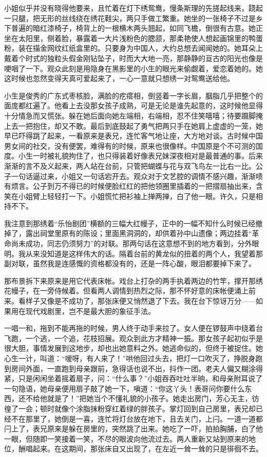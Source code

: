 \par 小姐似乎并没有晓得他要来，且忙着在灯下绣鸳鸯，慢条斯理的先搓起线来，跷起一只腿，把无形的丝线绕在绣花鞋尖，两只手做工繁重。她坐的一张椅子不过是乡下普遍的暗红漆椅子，椅背上的一根横木两头翘起，如同飞檐，倒很有古意。她正坐在太阳里，侧着脸，暴露着一大片浅粉色的腮颔，那柔艳使人想起画锦里的鸭蛋粉，装在描金网纹红纸盒里的。只要身为中国人，大约总想去闻闻她的。她耳朵上戴着个时式的独粒头假金刚钻坠子，时而大大地一亮，那静静的亘古的阳光也像是哽咽了一下。观众此刻是用隐身在黑影里的小生的眼光来偷觑着，爱恋着她的。她这时候也忽然变得天真可爱起来了，一心一意就只想绣一对鸳鸯送给他。
\par 小生是俊秀的广东式枣核脸，满脸的疙瘩相，倒竖着一字长眉，胭脂几乎把整个的面庞都红遍了。他看上去没那女孩子成熟，可是无论是谁先起意的，这时候他显得十分情急而又慌张。躲在她后面向她左端相，右端相，忍不住笑嘻嘻；待要蹑脚掩上去一把抱住，却又不敢。最后到底鼓起了勇气把两只手在她肩上虚虚的一笼，她早已吓得跳了起来，一看原来是表兄，连忙客气地让座，大方地对谈。古时候中国男女间的社交，没有便罢，难得有的时候，原来也很像样。中国原是个不可测的国度。小生一时被礼貌拘住了，也只得装着好像表兄妹深夜相对是最普通的事。后来渐渐的言不及义起来，两人站在台前，只管把蝴蝶与花与双飞鸟左一比右一比。公子一句话逼过来，小姐又一句话宕开去。观众对于文艺腔的调情不感兴趣，渐渐啧有烦言。公子到万不得已的时候便脸红红的把他领圈里插着的一把摺扇抽出来，含笑在小姐臂上轻轻打一下。小姐慌忙把衫袖上掸两掸，白了他一眼。许久，只是相持不下。
\par 我注意到那绣着“乐怡剧团”横额的三幅大红幔子，正中的一幅不知什么时候已经撤掉了，露出祠堂里原有的陈设；里面黑洞洞的，却供着孙中山遗像；两边挂着“革命尚未成功，同志仍须努力”的对联。那两句话在这意想不到的地方看到，分外眼明。我从来没知道是这样伟大的话。隔着台前的黄龙似的扭着的两个人，我望着那副对联，虽然我是连感慨的资格都没有的，还是一阵心酸，眼泪都要掉下来了。
\par 那布景拆下来原来是用它代表床帐。戏台上打杂的两手执着两边的竹竿，撑开那绣花幔子，在一旁侍候着。但看两人调情到热烈之际，那不怀好意的床帐便涌上前来。看样子又像是不成功了，那张床便又悄然退了下去。我在台下惊讶万分——如果用在现代戏剧里，岂不是最大胆的象征手法。
\par 一唱一和，拖到不能再拖的时候，男人终于动手来拉了。女人便在锣鼓声中绕着台飞跑，一个逃，一个追，花枝招展。观众到此方才精神一振。那女孩子起初似乎是很大胆，事情发展到这地步，却也出她意料之外。她逃命似的，但终于被捉住。她心生一计，叫道：“嗳呀，有人来了！”哄他回过头去，把灯一口吹灭了，挣脱身跑到房间外面，一直跑到母亲跟前，急得话也说不出，抖作一团。老夫人偏又糊涂得紧，只是闲闲坐着摇着扇子，问：“什么事？”小姐吞吞吐吐半晌，和母亲附耳说了一句隐语，她母亲便用扇子敲了她一下，嗔道：“你这丫头！表哥问你要什么东西，还不给他就是了！”把她当个不懂礼貌的小孩子。她走出房门，芳心无主，彷徨了一会；顿时就像个涂脂抹粉穿红着绿的胖孩子。掌灯回到自己房里，表兄却已经不在那里了，她倒是一喜，连忙将灯台放在地下，且去关门，上闩。一道一道都闩上了，表兄原来是躲在房里的，突然跳了出来。她吃了一吓，拍拍胸脯，白了他一眼，但随即一笑接着一笑，不尽的眼波向他流过去。两人重新又站到原来的地位，酬唱起来。在这期间，那张床自又出现了，在左近一耸一耸的只是徘徊不去。
